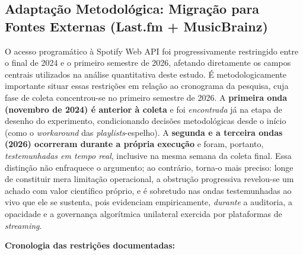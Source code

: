 \documentclass[12pt, %
openright,
oneside, %
a4paper,    %
english,   %
brazil]{facom-ufu-abntex2}
\begin{document}
\subsection{Adaptação Metodológica: Migração para Fontes Externas (Last.fm + MusicBrainz)}
\label{sec:adaptacao}

O acesso programático à Spotify Web API foi progressivamente restringido entre o
final de 2024 e o primeiro semestre de 2026, afetando
diretamente os campos centrais utilizados na análise quantitativa deste estudo. É
metodologicamente importante situar essas restrições em relação ao cronograma da
pesquisa, cuja fase de coleta concentrou-se no primeiro semestre de 2026. A
\textbf{primeira onda (novembro de 2024) é anterior à coleta} e foi
\emph{encontrada} já na etapa de desenho do experimento, condicionando decisões
metodológicas desde o início (como o \emph{workaround} das \emph{playlists}-espelho).
A \textbf{segunda e a terceira ondas (2026) ocorreram durante a própria execução}
e foram, portanto, \emph{testemunhadas em tempo real}, inclusive na mesma semana
da coleta final. Essa distinção não enfraquece o argumento; ao contrário, torna-o
mais preciso: longe de constituir mera limitação operacional, a obstrução
progressiva revelou-se um achado com valor científico próprio, e é sobretudo nas
ondas testemunhadas ao vivo que ele se sustenta, pois evidenciam empiricamente,
\emph{durante} a auditoria, a opacidade e a governança algorítmica unilateral
exercida por plataformas de \emph{streaming}.

\textbf{Cronologia das restrições documentadas:}
\end{document}
